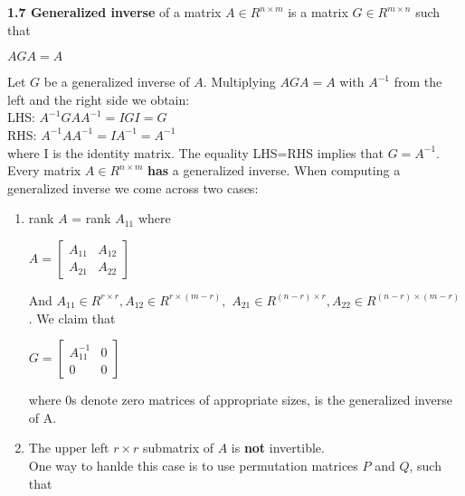 \documentclass{article}
\begin{document}
\begin{multicols}{3}
\textbf{1.7 Generalized inverse} of a matrix
$A \in R^{n \times m}$ is a matrix $G \in R^{m \times n}$ such that
\begin{center}
    $AGA = A$
\end{center}
Let $G$ be a generalized inverse of $A$. Multiplying $AGA=A$ with $A^{-1}$ from the
left and the right side we obtain:\\
LHS: $A^{-1}GAA^{-1} = IGI = G$\\
RHS: $A^{-1}AA^{-1} = IA^{-1} = A^{-1}$\\
where I is the identity matrix. The equality LHS=RHS implies that $G=A^{-1}$.\\
Every matrix $A \in R^{n \times m}$ \textbf{has} a generalized inverse. When computing
a generalized inverse we come across two cases:
\begin{enumerate}
    \item rank $A$ = rank $A_{11}$ where
        \begin{center}
            \begin{math}
                A=
                \begin{bmatrix}
                    A_{11} & A_{12} \\
                    A_{21} & A_{22}
                \end{bmatrix}
            \end{math}
        \end{center}
        And $A_{11} \in R^{r \times r}, A_{12} \in R^{r \times (m-r)},$
        $ A_{21} \in R^{(n-r) \times r}, A_{22} \in R^{(n-r)\times (m-r)}$.
        We claim that
        \begin{center}
            \begin{math}
                G=
                \begin{bmatrix}
                    A_{11}^{-1} & 0 \\
                    0           & 0
                \end{bmatrix}
            \end{math}
        \end{center}
        where 0s denote zero matrices of appropriate sizes, is the generalized inverse of A.
    \item The upper left $r \times r$ submatrix of $A$ is \textbf{not} invertible.\\
        One way to hanlde this case is to use permutation matrices $P$ and $Q$, such that
        \begin{center}
            \begin{math}

\end{math}
\end{center}
\end{enumerate}
\end{multicols}
\end{document}
